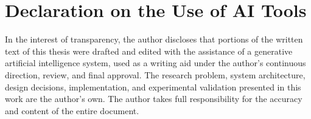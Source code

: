 \backmatter

\cleardoublepage
\chapter*{Declaration on the Use of AI Tools}

In the interest of transparency, the author discloses that portions of the written text of this thesis were drafted and edited with the assistance of a generative artificial intelligence system, used as a writing aid under the author's continuous direction, review, and final approval. The research problem, system architecture, design decisions, implementation, and experimental validation presented in this work are the author's own. The author takes full responsibility for the accuracy and content of the entire document.
\cleardoublepage

\printbibliography
{}

\listoffigures
{}

\listoftables
{}